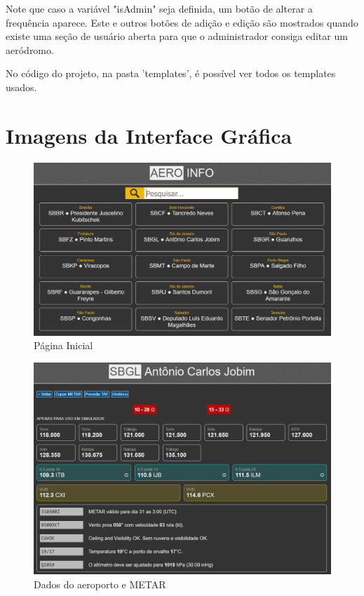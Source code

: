 Note que caso a variável "isAdmin" seja definida, um botão de alterar a frequência aparece. Este
e outros botões de adição e edição são mostrados quando existe uma seção de usuário aberta para que o administrador
consiga editar um aeródromo.

No código do projeto, na pasta 'templates', é possível ver todos os templates usados.

\section{Imagens da Interface Gráfica}

\begin{figure}[ht]
    \begin{center}
    \includegraphics[width=400pt]{img/sel-aeroporto.png}
    \caption{Página Inicial}
    \label{fig:sel-aeroporto}
    \end{center}
\end{figure}

\begin{figure}[ht]
    \begin{center}
    \includegraphics[width=400pt]{img/img-metar.png}
    \caption{Dados do aeroporto e METAR}
    \label{fig:img-metar.png}
    \end{center}
\end{figure}

